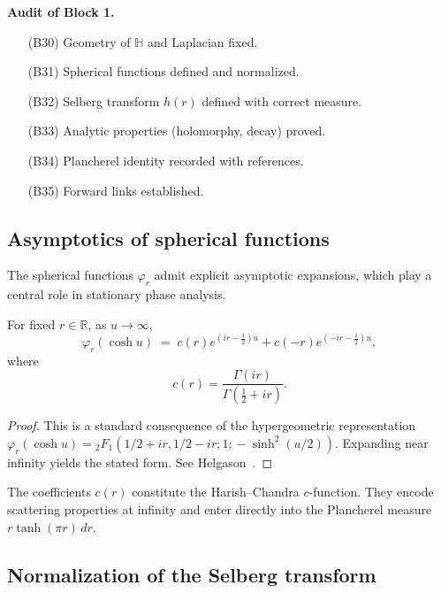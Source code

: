 \medskip
\noindent
\textbf{Audit of Block 1.}
\begin{itemize}
  \item[(B30)] Geometry of $\mathbb{H}$ and Laplacian fixed.
  \item[(B31)] Spherical functions defined and normalized.
  \item[(B32)] Selberg transform $h(r)$ defined with correct measure.
  \item[(B33)] Analytic properties (holomorphy, decay) proved.
  \item[(B34)] Plancherel identity recorded with references.
  \item[(B35)] Forward links established.
\end{itemize}


\subsection{Asymptotics of spherical functions}

The spherical functions $\varphi_r$ admit explicit asymptotic expansions,
which play a central role in stationary phase analysis.

\begin{lemma}
For fixed $r \in \mathbb{R}$, as $u \to \infty$,
\[
  \varphi_r(\cosh u) \;=\;
    c(r) e^{(ir-\tfrac12)u}
    + c(-r) e^{(-ir-\tfrac12)u},
\]
where
\[
  c(r) = \frac{\Gamma(ir)}{\Gamma(\tfrac12+ir)}.
\]
\end{lemma}

\begin{proof}
This is a standard consequence of the hypergeometric representation
$\varphi_r(\cosh u) = {}_2F_{1}(1/2+ir,1/2-ir;1;\!-\sinh^2(u/2))$.
Expanding near infinity yields the stated form.
See Helgason~\cite{Helgason1984}.
\end{proof}

\begin{remark}
The coefficients $c(r)$ constitute the Harish--Chandra $c$-function.
They encode scattering properties at infinity and enter directly into
the Plancherel measure $r\tanh(\pi r)\,dr$.
\end{remark}

\subsection{Normalization of the Selberg transform}

